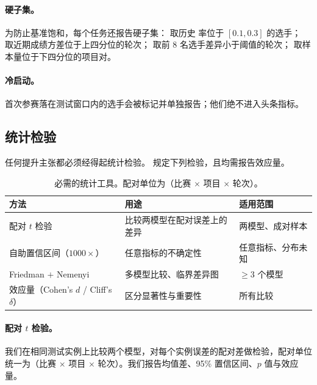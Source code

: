 \paragraph{硬子集。}为防止基准饱和，每个任务还报告硬子集： 取历史 \DNF{} 率位于 $[0.1, 0.3]$ 的选手； 取近期成绩方差位于上四分位的轮次； 取前 8 名选手差异小于阈值的轮次； 取样本量位于下四分位的项目对。

\paragraph{冷启动。}首次参赛落在测试窗口内的选手会被标记并单独报告；他们绝不进入头条指标。

\subsection{统计检验}
\label{sec:protocol-stats}

任何提升主张都必须经得起统计检验。\wcabench{} 规定下列检验，且均需报告效应量。

\begin{table}[t]
  \centering
  \footnotesize
  \begin{threeparttable}
  \caption{必需的统计工具。配对单位为（比赛 $\times$ 项目 $\times$ 轮次）。}
  \label{tab:stats}
  \begin{tabularx}{\linewidth}{@{}>{\raggedright\arraybackslash}p{3.3cm}
                                >{\raggedright\arraybackslash}X
                                >{\raggedright\arraybackslash}X@{}}
    \toprule
    方法 & 用途 & 适用范围 \\
    \midrule
    配对 $t$ 检验 & 比较两模型在配对误差上的差异 & 两模型、成对样本 \\
    自助置信区间（$1000\times$） & 任意指标的不确定性 & 任意指标、分布未知 \\
    Friedman $+$ Nemenyi & 多模型比较、临界差异图 & $\ge 3$ 个模型 \\
    效应量（Cohen's $d$ / Cliff's $\delta$） & 区分显著性与重要性 & 所有比较 \\
    \bottomrule
  \end{tabularx}
  \end{threeparttable}
\end{table}

\paragraph{配对 $t$ 检验。}我们在相同测试实例上比较两个模型，对每个实例误差的配对差做检验，配对单位统一为（比赛 $\times$ 项目 $\times$ 轮次）。我们报告均值差、95\% 置信区间、$p$ 值与效应量。

